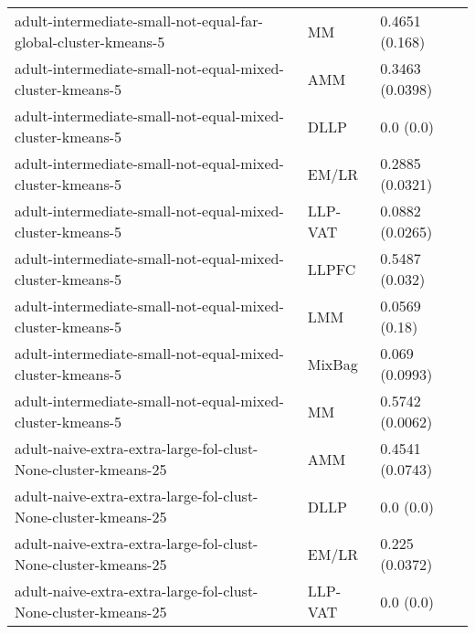 \begin{longtable}{lll}
                                               adult-intermediate-small-not-equal-far-global-cluster-kmeans-5 &        MM &                        0.4651 (0.168) \\
                                                    adult-intermediate-small-not-equal-mixed-cluster-kmeans-5 &       AMM &                       0.3463 (0.0398) \\
                                                    adult-intermediate-small-not-equal-mixed-cluster-kmeans-5 &      DLLP &                             0.0 (0.0) \\
                                                    adult-intermediate-small-not-equal-mixed-cluster-kmeans-5 &     EM/LR &                       0.2885 (0.0321) \\
                                                    adult-intermediate-small-not-equal-mixed-cluster-kmeans-5 &   LLP-VAT &                       0.0882 (0.0265) \\
                                                    adult-intermediate-small-not-equal-mixed-cluster-kmeans-5 &     LLPFC &                        0.5487 (0.032) \\
                                                    adult-intermediate-small-not-equal-mixed-cluster-kmeans-5 &       LMM &                         0.0569 (0.18) \\
                                                    adult-intermediate-small-not-equal-mixed-cluster-kmeans-5 &    MixBag &                        0.069 (0.0993) \\
                                                    adult-intermediate-small-not-equal-mixed-cluster-kmeans-5 &        MM &                       0.5742 (0.0062) \\
                                               adult-naive-extra-extra-large-fol-clust-None-cluster-kmeans-25 &       AMM &                       0.4541 (0.0743) \\
                                               adult-naive-extra-extra-large-fol-clust-None-cluster-kmeans-25 &      DLLP &                             0.0 (0.0) \\
                                               adult-naive-extra-extra-large-fol-clust-None-cluster-kmeans-25 &     EM/LR &                        0.225 (0.0372) \\
                                               adult-naive-extra-extra-large-fol-clust-None-cluster-kmeans-25 &   LLP-VAT &                             0.0 (0.0) \\

\end{longtable}

